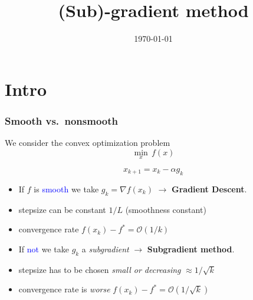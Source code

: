 \documentclass{beamer}
\title{(Sub)-gradient method}
\date{\today}
\begin{document}
\maketitle
\frame{\tableofcontents}

\section{Intro}%

\begin{frame}
  \frametitle{Smooth vs.\ nonsmooth}
  We consider the convex optimization problem
  \begin{equation}
    \min_x \, f(x)
  \end{equation}
  \vspace{-0.5cm}
  \begin{block}{}
    \begin{equation}
      x_{k+1} = x_k - \alpha g_k
    \end{equation}
  \end{block}
  \begin{adjustwidth}{-1.5em}{-1.5em}
    \begin{minipage}{0.52\textwidth}
      \begin{block}{}
        \begin{itemize}
          \item If $f$ is \textcolor{blue}{smooth} we take $g_k = \nabla f(x_k)$ $\rightarrow$ \textbf{Gradient Descent}.
          \item stepsize can be constant $1/L$ (smoothness constant)
          \item convergence rate $f(x_k)-f^* = \mathcal{O}(1/k)$
        \end{itemize}
      \end{block}
    \end{minipage}
    \hfill
    \begin{minipage}{0.52\textwidth}
      \begin{block}{}
        \begin{itemize}
          \item If \textcolor{blue}{not} we take $g_k$ a \textit{subgradient} $\rightarrow$ \textbf{Subgradient method}.
          \item stepsize has to be chosen \emph{small or decreasing} $\approx 1/\sqrt{k}$
          \item convergence rate is \emph{worse} $f(x_k)-f^* = \mathcal{O}(1/\sqrt{k})$
        \end{itemize}
      \end{block}
    \end{minipage}
  \end{adjustwidth}
\end{frame}
\end{document}
